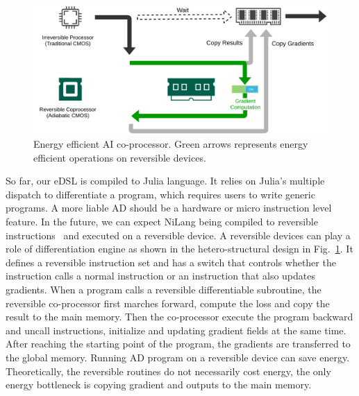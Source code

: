 \documentclass{article}
\newcommand{\<}{\langle}
\renewcommand{\>}{\rangle}
\newcommand{\Fig}[1]{Fig.~\ref{#1}}
\theoremstyle{definition}\newtheorem{definition}{\textit{Definition}}
\begin{document}
\begin{figure}
    \centerline{\includegraphics[width=0.8\columnwidth,trim={0 0cm 0 0cm},clip]{hardware.pdf}}
    \caption{Energy efficient AI co-processor. Green arrows represents energy efficient operations on reversible devices.}\label{fig:hardware}
\end{figure}
So far, our eDSL is compiled to Julia language. It relies on Julia's multiple dispatch to differentiate a program, which requires users to write generic programs.
A more liable AD should be a hardware or micro instruction level feature.
In the future, we can expect NiLang being compiled to reversible instructions~\cite{Vieri1999} and executed on a reversible device.
A reversible devices can play a role of differentiation engine as shown in the hetero-structural design in \Fig{fig:hardware}.
It defines a reversible instruction set and has a switch that controls whether the instruction calls a normal instruction or an instruction that also updates gradients.
When a program calls a reversible differentiable subroutine, the reversible co-processor first marches forward, compute the loss and copy the result to the main memory.
Then the co-processor execute the program backward and uncall instructions, initialize and updating gradient fields at the same time.
After reaching the starting point of the program, the gradients are transferred to the global memory.
Running AD program on a reversible device can save energy. Theoretically, the reversible routines do not necessarily cost energy, the only energy bottleneck is copying gradient and outputs to the main memory.
\end{document}
